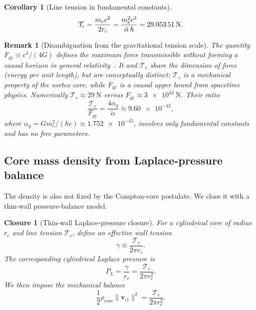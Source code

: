 \documentclass[aps,pra,preprint,longbibliography,nofootinbib]{revtex4-2}
\newtheorem{corollary}{Corollary}
\newtheorem{remark}{Remark}
\newtheorem{closure}{Closure}
\newcommand{\vnorm}{\lVert\mathbf{v}_{\!\boldsymbol{\circlearrowleft}}\rVert} %
\newcommand{\rhocore}{\rho_{\mathrm{core}}}      %
\newcommand{\rc}{r_c}                            %
\newcommand{\Tc}{\mathcal{T}_c}                  %
\newcommand{\Fgr}{F_{\mathrm{gr}}}              %
\begin{document}
\begin{corollary}[Line tension in fundamental constants]
\label{cor:Tc}
\begin{equation}
  \Tc = \frac{m_e c^2}{2\rc}
      = \frac{m_e^2 c^3}{\tilde\alpha\,\hbar}
      = \SI{29.053\,51}{\newton}.
  \label{eq:Tc}
\end{equation}
\end{corollary}

\begin{remark}[Disambiguation from the gravitational tension scale]
\label{rem:Fgr}
The quantity $\Fgr \equiv c^4/(4G)$ defines the maximum force
transmissible without forming a causal horizon in general
relativity~\cite{Gibbons2002,Schiller2006}.
It and $\Tc$ share the dimension of force (energy per unit length),
but are conceptually distinct:
$\Tc$ is a mechanical property of the vortex core, while $\Fgr$ is
a causal upper bound from spacetime physics.
Numerically $\Tc \approx \SI{29}{\newton}$ versus
$\Fgr \approx \SI{3e43}{\newton}$.
Their ratio
\begin{equation}
  \frac{\Tc}{\Fgr} = \frac{4\alpha_g}{\tilde\alpha}
                   \approx \num{9.60e-43},
  \label{eq:tension_ratio}
\end{equation}
where $\alpha_g = Gm_e^2/(\hbar c) \approx \num{1.752e-45}$,
involves only fundamental constants and has no free parameters.
\end{remark}

\subsection{Core mass density from Laplace-pressure balance}
\label{sec:rhocore}

The density is also not fixed by the Compton-core postulate.  We close
it with a thin-wall pressure-balance model.

\begin{closure}[Thin-wall Laplace-pressure closure]
\label{cl:laplace}
For a cylindrical core of radius $\rc$ and line tension $\Tc$, define an
effective wall tension
\begin{equation}
  \gamma \equiv \frac{\Tc}{2\pi\rc}.
  \label{eq:wall_tension}
\end{equation}
The corresponding cylindrical Laplace pressure is
\begin{equation}
  P_L = \frac{\gamma}{\rc} = \frac{\Tc}{2\pi\rc^2}.
  \label{eq:Laplace}
\end{equation}
We then impose the mechanical balance
\begin{equation}
  \frac{1}{2}\rhocore\vnorm^2 = \frac{\Tc}{2\pi\rc^2}.
  \label{eq:pressure_balance}
\end{equation}
\end{closure}
\end{document}
